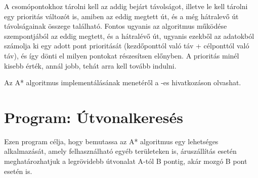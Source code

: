 A csomópontokhoz tárolni kell az addig bejárt távolságot, illetve le kell tárolni egy prioritás változót is, amiben az eddig megtett út, és a még hátralevő út távolságainak összege található. Fontos ugyanis az algoritmus működése szempontjából az eddig megtett, és a hátralévő út, ugyanis ezekből az adatokból számolja ki egy adott pont prioritását (kezdőponttól való táv + célponttól való táv), és így dönti el milyen pontokat részesítsen előnyben. A prioritás minél kisebb érték, annál jobb, tehát arra kell tovább indulni.

Az A* algoritmus implementálásának menetéről a \cite{Astar3}-es hivatkozáson olvashat.


\section{Program: Útvonalkeresés}

Ezen program célja, hogy bemutassa az A* algoritmus egy lehetséges alkalmazását, amely felhasználható egyéb területeken is, áruszállítás esetén meghatározhatjuk a legrövidebb útvonalat A-tól B pontig, akár mozgó B pont esetén is.

